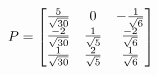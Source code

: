\documentclass[preview]{standalone}
\begin{document}
\begin{align*}
\special{dvisvgm:raw <g id='unique000'>}P = \begin{bmatrix}\frac{5}{\sqrt{30}} & 0 & -\frac{1}{\sqrt{6}} \\\frac{-2}{\sqrt{30}} & \frac{1}{\sqrt{5}} & \frac{-2}{\sqrt{6}} \\\frac{1}{\sqrt{30}} & \frac{2}{\sqrt{5}} & \frac{1}{\sqrt{6}}\end{bmatrix}\special{dvisvgm:raw </g>}
\end{align*}
\end{document}
